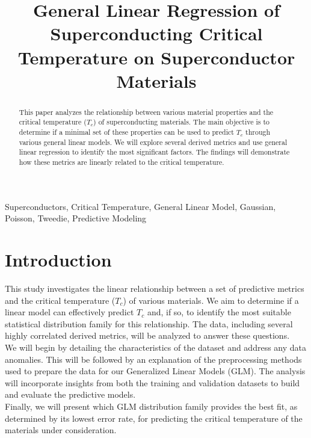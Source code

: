 \documentclass[conference]{IEEEtran}
\begin{document}
\title{General Linear Regression of Superconducting Critical Temperature on Superconductor Materials}

\author{
}


\maketitle

\begin{abstract}
This paper analyzes the relationship between various material properties and the critical temperature ($T_c$) of superconducting materials. The main objective is to determine if a minimal set of these properties can be used to predict $T_c$ through various general linear models. We will explore several derived metrics and use general linear regression to identify the most significant factors. The findings will demonstrate how these metrics are linearly related to the critical temperature. \\
\end{abstract}

\begin{IEEEkeywords}
Superconductors,
Critical Temperature,
General Linear Model,
Gaussian, Poisson, Tweedie, Predictive Modeling
\end{IEEEkeywords}

\section{\textbf{Introduction}}
This study investigates the linear relationship between a set of predictive metrics and the critical temperature ($T_c$) of various materials. We aim to determine if a linear model can effectively predict $T_c$ and, if so, to identify the most suitable statistical distribution family for this relationship. The data, including several highly correlated derived metrics, will be analyzed to answer these questions. \\
\indent We will begin by detailing the characteristics of the dataset and address any data anomalies. This will be followed by an explanation of the preprocessing methods used to prepare the data for our Generalized Linear Models (GLM). The analysis will incorporate insights from both the training and validation datasets to build and evaluate the predictive models.\\
\indent Finally, we will present which GLM distribution family provides the best fit, as determined by its lowest error rate, for predicting the critical temperature of the materials under consideration.
\end{document}
